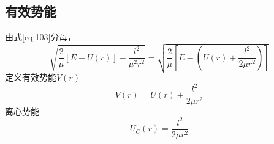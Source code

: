 \documentclass{article}
\begin{document}
\subsection{有效势能}

由式\ref{eq:103}分母，
\begin{equation}
  \label{eq:118}
    \sqrt{\dfrac{2}{\mu} \left[ E - U(r) \right] - \dfrac{l^{2}}{\mu^{2} r^{2}} } = \sqrt{\dfrac{2}{\mu} \left[ E - \left( U(r)  + \dfrac{l^{2}}{2 \mu r^{2}} \right) \right]}
\end{equation}
定义有效势能$V(r)$
\begin{equation}
  \label{eq:119}
  V(r) = U(r)  + \dfrac{l^{2}}{2 \mu r^{2}}
\end{equation}
离心势能
\begin{equation}
  \label{eq:120}
  U_{C}(r) = \dfrac{l^{2}}{2 \mu r^{2}}
\end{equation}
\end{document}
